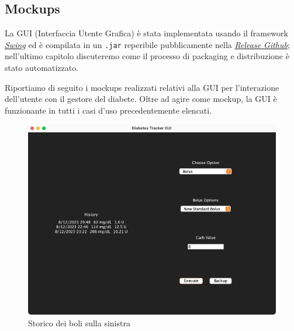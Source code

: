 \documentclass[twocolumn]{article}
\begin{document}
\clearpage

\subsection{Mockups}

La GUI (Interfaccia Utente Grafica) è stata implementata usando il framework \href{https://it.wikipedia.org/wiki/Swing_(Java)}{\textit{Swing}} ed è compilata in un \texttt{.jar} reperibile pubblicamente nella \href{https://github.com/federicomarra/swe-diab/releases}{\textit{Release Github}}; nell'ultimo capitolo discuteremo come il processo di packaging e distribuzione è stato automatizzato.

Riportiamo di seguito i mockups realizzati relativi alla GUI per l’interazione dell'utente con il gestore del diabete. Oltre ad agire come mockup, la GUI è funzionante in tutti i casi d'uso precedentemente elencati.

\null\vfill
\begin{figure}[!htbp]
    \centering
    \includegraphics[width=14cm]{gui-history.png}
    \caption{Storico dei boli sulla sinistra}
    \label{fig:gui-history}
\end{figure}
\vfill\null
\end{document}
